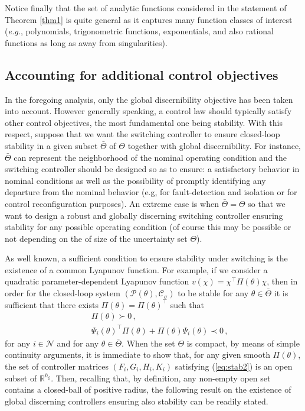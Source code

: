 \documentclass[letterpaper, 10 pt, conference]{ieeetran}
\begin{document}
Notice finally that the set of analytic functions considered in the statement of Theorem \ref{thm1} is quite general as it captures many function classes of interest 
(\emph{e.g.}, polynomials, 
trigonometric functions, exponentials, and also rational functions as long as away from singularities). 

\subsection{Accounting for additional control objectives}

In the foregoing analysis, only the global discernibility objective has been taken into account. However
generally speaking, a control law should typically satisfy other control objectives, the most fundamental one being stability.
With this respect, suppose that we want the switching controller to ensure closed-loop stability in a given subset $\bar \Theta$ of $\Theta$ together with
global discernibility. For instance, $\bar \Theta $ can represent the neighborhood of the nominal operating condition and the switching controller should
be designed so as to ensure: a satisfactory behavior in nominal conditions as well as the possibility of promptly identifying any departure from the nominal behavior (e.g, 
for fault-detection and isolation or for control reconfiguration purposes). An extreme case is when $\bar \Theta = \Theta$ so that we want to design a robust and globally discerning 
switching controller ensuring stability for any possible operating condition (of course this may be possible or not depending on the of size of the uncertainty set $\Theta$).

As well known, a sufficient condition to ensure stability under switching is the existence of a common Lyapunov function. For example, if we consider a quadratic parameter-dependent
Lyapunov function
$v(\chi) = \chi^\top \Pi(\theta) \chi$, then in order for the closed-loop system $(\mathcal P (\theta), \mathcal C_\sigma)$ to be stable for any $\theta \in \bar \Theta$ it is sufficient that
there exists $\Pi(\theta) = \Pi(\theta)^\top$ such that
\begin{eqnarray}
&& \Pi (\theta) \succ 0  \, , \label{eq:stab1} \\
&& \Psi_i (\theta)^\top \Pi (\theta) + \Pi(\theta) \Psi_i (\theta) \prec 0 \, ,  \label{eq:stab2}
\end{eqnarray}
for any $i \in \mathcal N$ and for any $\theta \in \bar \Theta$. When the set $\Theta$ is compact, by means of simple continuity arguments, it is immediate to show
that, for any given smooth $\Pi(\theta)$, the set of controller matrices $(F_i, G_i, H_i, K_i)$ satisfying (\ref{eq:stab2}) is an open subset of $\mathbb R^{\bar n_\xi}$.
Then, recalling that, by definition, any non-empty open set contains a closed-ball of positive radius, the following result on the existence of global discerning controllers ensuring also stability
can be readily stated. 
\end{document}
